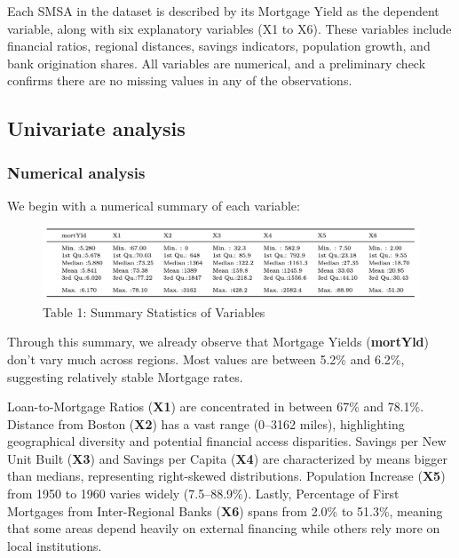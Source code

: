 \documentclass[
  12pt,
]{article}
\begin{document}
Each SMSA in the dataset is described by its Mortgage Yield as the
dependent variable, along with six explanatory variables (X1 to X6).
These variables include financial ratios, regional distances, savings
indicators, population growth, and bank origination shares. All
variables are numerical, and a preliminary check confirms there are no
missing values in any of the observations.

\subsection{Univariate analysis}\label{univariate-analysis}

\subsubsection{Numerical analysis}\label{numerical-analysis}

We begin with a numerical summary of each variable:

\vspace{-0.5cm}
\begin{figure}[H]
\centering
\includegraphics[width=1.0\textwidth]{figures/Table 1.png}
\caption*{Table 1: Summary Statistics of Variables}
\end{figure}
\vspace{-0.5cm}

Through this summary, we already observe that Mortgage Yields
(\textbf{mortYld}) don't vary much across regions. Most values are
between 5.2\% and 6.2\%, suggesting relatively stable Mortgage rates.

Loan-to-Mortgage Ratios (\textbf{X1}) are concentrated in between 67\%
and 78.1\%. Distance from Boston (\textbf{X2}) has a vast range (0--3162
miles), highlighting geographical diversity and potential financial
access disparities. Savings per New Unit Built (\textbf{X3}) and Savings
per Capita (\textbf{X4}) are characterized by means bigger than medians,
representing right-skewed distributions. Population Increase
(\textbf{X5}) from 1950 to 1960 varies widely (7.5--88.9\%). Lastly,
Percentage of First Mortgages from Inter-Regional Banks (\textbf{X6})
spans from 2.0\% to 51.3\%, meaning that some areas depend heavily on
external financing while others rely more on local institutions.
\end{document}
